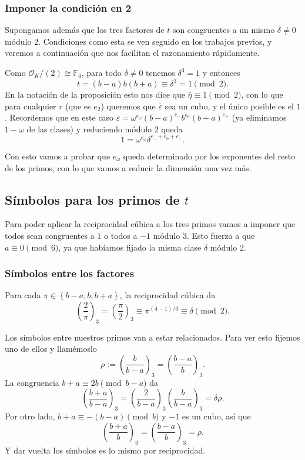 \documentclass[a4paper]{book}
\theoremstyle{definition}
\theoremstyle{plain}
\newcommand{\FF}{\mathbb{F}}
\newcommand{\OO}{\mathcal{O}}
\newcommand{\cub}[2]{\left(\frac{#1}{#2}\right)_3}
\newcommand{\lla}{\left\lbrace}
\newcommand{\rla}{\right\rbrace}
\begin{document}
\subsubsection*{Imponer la condición en 2}\label{ej:criterioPrimoDos}

Supongamos además que los tres factores de $t$ son congruentes a un mismo $\delta\neq 0$ módulo $2$. Condiciones como esta se ven seguido en los trabajos previos, y veremos a continuación que nos facilitan el razonamiento rápidamente.

Como $\OO_K/(2)\cong\FF_4$, para todo $\delta\neq 0$ tenemos $\delta^3 = 1$ y entonces
\[
t=(b-a)b(b+a)\equiv\delta^3=1\pmod2.
\]
En la notación de la proposición esto nos dice que $\bar\eta \equiv 1 \pmod 2$, con lo que para cualquier $r$ (que es $e_2$) queremos que $\overline\varepsilon$ sea un cubo, y el único posible es el $1$. Recordemos que en este caso $\varepsilon=\omega^{e_\omega} {(b-a)}^{e_-} b^{e_0} {(b+a)}^{e_+}$ (ya eliminamos $1-\omega$ de las clases) y reduciendo módulo 2 queda 
\[
1= \omega^{e_\omega}\delta^{e_- + e_0 + e_+}.
\]

Con esto vamos a probar que $e_\omega$ queda determinado por los exponentes del resto de los primos, con lo que vamos a reducir la dimensión una vez más.

\subsection{Símbolos para los primos de \texorpdfstring{$t$}{t}}

Para poder aplicar la reciprocidad cúbica a los tres primos vamos a imponer que todos sean congruentes a $1$ o todos a $-1$ módulo 3. Esto fuerza a que $a\equiv 0 \pmod 6$, ya que habíamos fijado la misma clase $\delta$ módulo 2.

\subsubsection*{Símbolos entre los factores}

Para cada $\pi\in\lla b-a,b,b+a\rla$, la reciprocidad cúbica da
\[
\cub{2}{\pi}=\cub{\pi}{2}\equiv\pi^{(4-1)/3}\equiv\delta\pmod2.
\]

Los símbolos entre nuestros primos van a estar relacionados. Para ver esto fijemos uno de ellos y llamémoslo
\[
\rho:=\cub{b}{b-a}=\cub{b-a}{b}.
\]
La congruencia $b+a\equiv2b\pmod{b-a}$ da
\[
\cub{b+a}{b-a}=\cub{2}{b-a}\cub{b}{b-a}=\delta\rho.
\]
Por otro lado, $b+a\equiv-(b-a)\pmod b$ y $-1$ es un cubo, así que
\[
\cub{b+a}{b}=\cub{b-a}{b}=\rho.
\]
Y dar vuelta los símbolos es lo mismo por reciprocidad.
\end{document}
